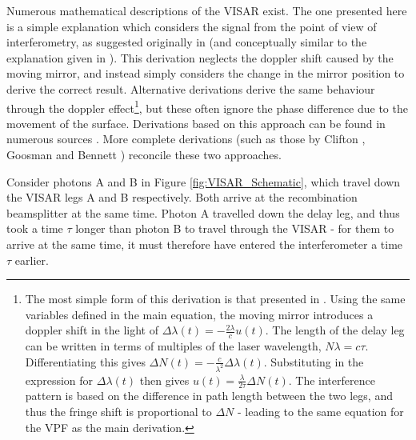 Numerous mathematical descriptions of the VISAR exist. The one presented here is a simple explanation which considers the signal from the point of view of interferometry, as suggested originally in \cite{Barker1968} (and conceptually similar to the explanation given in \cite{Barker2000}). This derivation neglects the doppler shift caused by the moving mirror, and instead simply considers the change in the mirror position to derive the correct result. Alternative derivations derive the same behaviour through the doppler effect\footnote{The most simple form of this derivation is that presented in \cite{Barker1968}. Using the same variables defined in the main equation, the moving mirror introduces a doppler shift in the light of $\Delta \lambda (t) = - \frac{2 \lambda}{c} u(t)$. The length of the delay leg can be written in terms of multiples of the laser wavelength, $N \lambda = c \tau$. Differentiating this gives $\Delta N(t) = - \frac{c}{\lambda^2}\Delta \lambda (t)$. Substituting in the expression for $\Delta \lambda (t)$ then gives $u(t) = \frac{\lambda}{2\tau} \Delta N(t)$. The interference pattern is based on the difference in path length between the two legs, and thus the fringe shift is proportional to $\Delta N$ - leading to the same equation for the VPF as the main derivation.}, but these often ignore the phase difference due to the movement of the surface. Derivations based on this approach can be found in numerous sources \cite{Barker1968, Barker1972, Barker2000, Hammel2018}. More complete derivations (such as those by Clifton \cite{Goosman1975a}, Goosman \cite{Goosman1975} and Bennett \cite{Bennett2016}) reconcile these two approaches.

Consider photons A and B in Figure \ref{fig:VISAR_Schematic}, which travel down the VISAR legs A and B respectively. Both arrive at the recombination beamsplitter at the same time. Photon A travelled down the delay leg, and thus took a time $\tau$ longer than photon B to travel through the VISAR - for them to arrive at the same time, it must therefore have entered the interferometer a time $\tau$ earlier.


